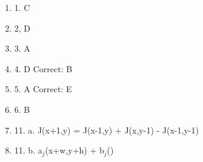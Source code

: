 \documentclass[11pt]{article}
\begin{document}
    \begin{enumerate}
        \item 1. C
        \item 2, D
        \item 3. A
        \item 4. D Correct: B
        \item 5. A Correct: E
        \item 6. B
        \item 11. a. J(x+1,y) = J(x-1,y) + J(x,y-1) - J(x-1,y-1)
        \item 11. b. a$_j$(x+w,y+h) + b$_j$()
    \end{enumerate}
\end{document}
